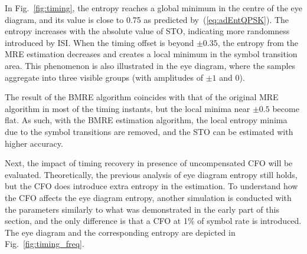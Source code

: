 \documentclass[12pt, draftclsnofoot, onecolumn]{IEEEtran}
\begin{document}
In Fig.~\ref{fig:timing}, the entropy reaches a global minimum in the centre of the eye diagram, and its value is close to 0.75 as predicted by~(\ref{eq:adEntQPSK}).
The entropy increases with the absolute value of STO, indicating  more randomness introduced by ISI.
When the timing offset is beyond $\pm 0.35$, the  entropy from the MRE estimation decreases and creates a local minimum in the symbol transition area. 
This phenomenon is also illustrated in the eye diagram, where the samples aggregate into three visible groups (with amplitudes of \(\pm 1\) and 0).

The result of the BMRE algorithm coincides with that of the original MRE algorithm in most of the timing instants, but the local minima near $\pm0.5$ become flat.
As such, with the BMRE estimation algorithm, the local entropy minima due to the symbol transitions are removed, and the STO can be estimated with higher accuracy.

Next, the impact of timing recovery in presence of uncompensated CFO will be evaluated.  
Theoretically, the previous analysis of eye diagram entropy still holds, but the CFO does introduce extra entropy in the estimation.
To understand how the CFO affects the eye diagram entropy, another simulation is conducted with the parameters similarly to what was demonstrated in the early part of this section,
and the only difference is that a CFO at 1\% of symbol rate is introduced.
The eye diagram and the corresponding entropy are depicted in Fig.~\ref{fig:timing_freq}.
      
\end{document}
